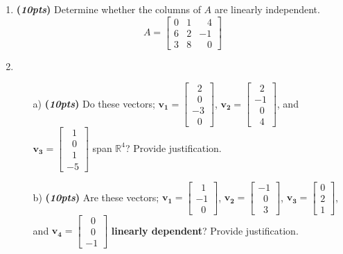 \documentclass[12pt]{article}%
\begin{document}
\begin{enumerate}
     \newpage



    \item \textbf{(\emph{10pts})} Determine whether the columns of \(A\) are linearly independent.
    \[ A =
    \begin{bmatrix} 0 & 1 & \;\;\;4\\6 & 2 & -1\\ 3 & 8 & \;\;\; 0 \end{bmatrix}
    \]

    \vspace{5cm}
    
    \item 
    \begin{itemize}
         
    \item[a)] \textbf{(\emph{10pts})} Do these vectors; 
    \(\mathbf{v_1} = \begin{bmatrix} \;\;2\\\;\;0\\-3\\\;\;0 \end{bmatrix}\),
    \(\mathbf{v_2} = \begin{bmatrix} \;\;2\\-1\\\;\;0\\\;\;4 \end{bmatrix}\), and 
    \(\mathbf{v_3} = \begin{bmatrix} \;\;1\\\;\;0\\\;\;1\\-5 \end{bmatrix}\)
    span \(\mathbb{R}^4\)? Provide justification.
    \vspace{5cm}
    
    \item[b)] \textbf{(\emph{10pts})} Are these vectors; 
    \(\mathbf{v_1} = \begin{bmatrix} \;\;1\\-1\\\;\;0 \end{bmatrix}\),
    \(\mathbf{v_2} = \begin{bmatrix}-1\\\;\;0\\\;\;3 \end{bmatrix}\),
    \(\mathbf{v_3} = \begin{bmatrix} 0\\2\\1 \end{bmatrix}\), and 
    \(\mathbf{v_4} = \begin{bmatrix} \;\;0\\\;\;0\\-1 \end{bmatrix}\)
    \textbf{linearly dependent}? Provide justification.
    \end{itemize}
    \vspace{7cm}
    

\end{enumerate}
\end{document}
